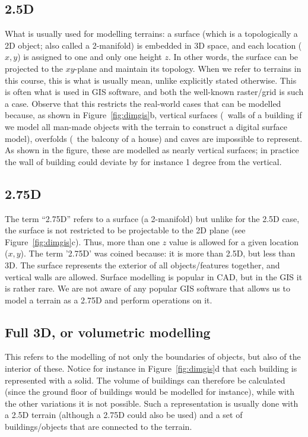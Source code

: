 \subsection{2.5D}%
What is usually used for modelling terrains: a surface (which is a topologically a 2D object; also called a 2-manifold) 
is embedded in 3D space, and each location ($x,y$) is assigned to one and only one height $z$.
In other words, the surface can be projected to the $xy$-plane and maintain its topology.
When we refer to terrains in this course, this is what is usually mean, unlike explicitly stated otherwise.
This is often what is used in GIS software, and both the well-known raster/grid  is such a case.
Observe that this restricts the real-world cases that can be modelled because, as shown in Figure~\ref{fig:dimgis}b, vertical surfaces (\eg\ walls of a building if we model all man-made objects with the terrain to construct a digital surface model), overfolds (\eg\ the balcony of a house) and caves are impossible to represent.
As shown in the figure, these are modelled as nearly vertical surfaces; in practice the wall of building could deviate by for instance 1 degree from the vertical. 

\subsection{2.75D}%
The term ``2.75D'' refers to a surface (a 2-manifold) but unlike for the 2.5D case, the surface is not restricted to be projectable to the 2D plane (see Figure~\ref{fig:dimgis}c).
Thus, more than one $z$ value is allowed for a given location ($x,y$).
The term '2.75D' was coined because: it is more than 2.5D, but less than 3D.
The surface represents the exterior of all objects/features together, and vertical walls are allowed.
Surface modelling is popular in CAD, but in the GIS it is rather rare.
We are not aware of any popular GIS software that allows us to model a terrain as a 2.75D and perform operations on it.

\subsection[3D]{Full 3D, or volumetric modelling} 
This refers to the modelling of not only the boundaries of objects, but also of the interior of these.
Notice for instance in Figure~\ref{fig:dimgis}d that each building is represented with a solid.
The volume of buildings can therefore be calculated (since the ground floor of buildings would be modelled for instance), while with the other variations it is not possible. 
Such a representation is usually done with a 2.5D terrain (although a 2.75D could also be used) and a set of buildings/objects that are connected to the terrain.




